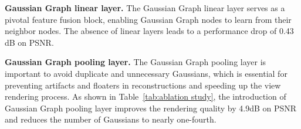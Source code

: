 \textbf{Gaussian Graph linear layer.} The Gaussian Graph linear layer serves as a pivotal feature fusion block, enabling Gaussian Graph nodes to learn from their neighbor nodes. The absence of linear layers leads to a performance drop of 0.43 dB on PSNR.


\textbf{Gaussian Graph pooling layer.} The Gaussian Graph pooling layer is important to avoid duplicate and unnecessary Gaussians, which is essential for preventing artifacts and floaters in reconstructions and speeding up the view rendering process. As shown in Table~\ref{tab:ablation study}, the introduction of Gaussian Graph pooling layer improves the rendering quality by 4.9dB on PSNR and reduces the number of Gaussians to nearly one-fourth. 
    